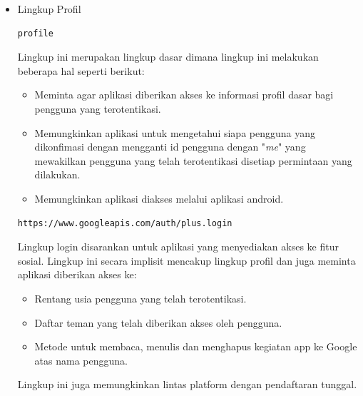 \begin{itemize}
\item Lingkup Profil\\
\begin{lstlisting}[basicstyle=\footnotesize]
profile
\end{lstlisting}
Lingkup ini merupakan lingkup dasar dimana lingkup ini melakukan beberapa hal
seperti berikut:
\begin{itemize}
\item
Meminta agar aplikasi diberikan akses ke informasi profil dasar bagi pengguna
yang terotentikasi.
\item
Memungkinkan aplikasi untuk mengetahui siapa pengguna yang dikonfimasi dengan
mengganti id pengguna dengan "{\it me}" yang mewakilkan pengguna yang telah
terotentikasi disetiap permintaan yang dilakukan.
\item
Memungkinkan aplikasi diakses melalui aplikasi android.
\end{itemize}
\begin{lstlisting}[basicstyle=\footnotesize]
https://www.googleapis.com/auth/plus.login
\end{lstlisting}
Lingkup login disarankan untuk aplikasi yang menyediakan akses ke fitur sosial.
Lingkup ini secara implisit mencakup lingkup profil dan juga meminta aplikasi
diberikan akses ke:
\begin{itemize}
\item
Rentang usia pengguna yang telah terotentikasi.
\item
Daftar teman yang telah diberikan akses oleh pengguna.
\item
Metode untuk membaca, menulis dan menghapus kegiatan app ke Google atas nama
pengguna.
\end{itemize}
Lingkup ini juga memungkinkan lintas platform dengan pendaftaran tunggal.


\end{itemize}
